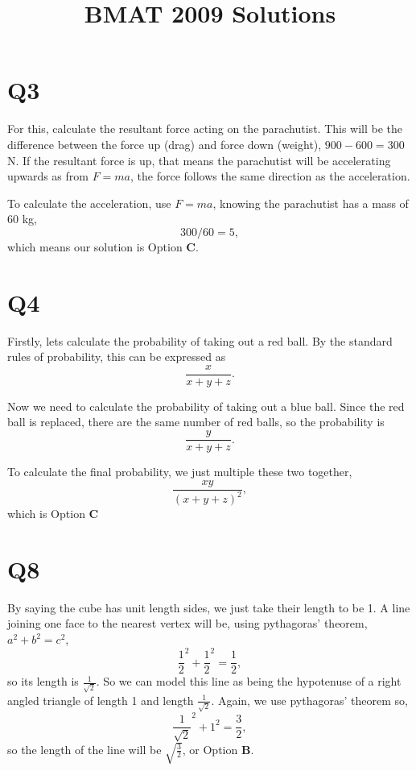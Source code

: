 \documentclass[11pt]{article}
\title{BMAT 2009 Solutions}
\author{}
\date{}                                           %
\begin{document}
\maketitle

\section*{Q3}
For this, calculate the resultant force acting on the parachutist.  This will be the difference between the force up (drag) and force down (weight), $900 - 600 = 300$ N.  If the resultant force is up, that means the parachutist will be accelerating upwards as from $F=ma$, the force follows the same direction as the acceleration.

To calculate the acceleration, use $F=ma$, knowing the parachutist has a mass of 60 kg,
\begin{equation*}
300/60 = 5,
\end{equation*}
which means our solution is Option \textbf{C}.

\section*{Q4}
Firstly, lets calculate the probability of taking out a red ball.  By the standard rules of probability, this can be expressed as 
\begin{equation*}
\frac{x}{x+y+z}.
\end{equation*}

Now we need to calculate the probability of taking out a blue ball.  Since the red ball is replaced, there are the same number of red balls, so the probability is
\begin{equation*}
\frac{y}{x+y+z}.
\end{equation*}

To calculate the final probability, we just multiple these two together,
\begin{equation*}
\frac{xy}{(x+y+z)^2},
\end{equation*}
which is Option \textbf{C}


\section*{Q8}
By saying the cube has unit length sides, we just take their length to be 1.  A line joining one face to the nearest vertex will be, using pythagoras' theorem, $a^2 + b^2 = c^2$,
\begin{equation*}
\frac{1}{2}^2 + \frac{1}{2}^2 = \frac{1}{2},
\end{equation*}
so its length is $\frac{1}{\sqrt{2}}$.  So we can model this line as being the hypotenuse of a right angled triangle of length 1 and length $\frac{1}{\sqrt{2}}$.  Again, we use pythagoras' theorem so,
\begin{equation*}
\frac{1}{\sqrt{2}}^2 + 1^2 = \frac{3}{2},
\end{equation*}
so the length of the line will be $\sqrt{\frac{3}{2}}$, or Option \textbf{B}.
\end{document}
